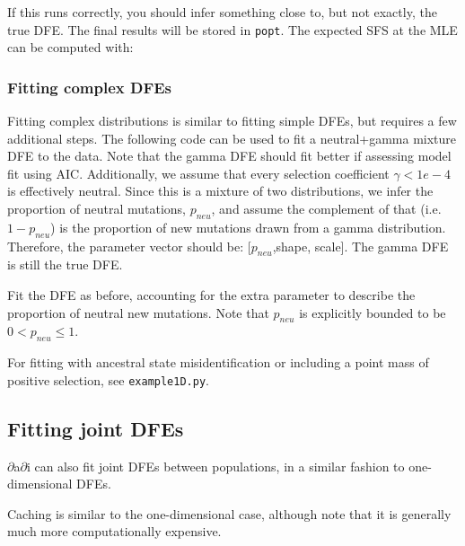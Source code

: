 \documentclass[12pt]{article}
\newcommand{\dadi}{$\partial$a$\partial$i\xspace}
\begin{document}
If this runs correctly, you should infer something close to, but not exactly, the true DFE. The final results will be stored in \texttt{popt}.
The expected SFS at the MLE can be computed with:



\subsubsection{Fitting complex DFEs}

Fitting complex distributions is similar to fitting simple DFEs, but requires a few additional steps. The following code can be used to fit a neutral+gamma mixture DFE to the data. Note that the gamma DFE should fit better if assessing model fit using AIC. Additionally, we assume that every selection coefficient $\gamma < 1e-4$ is effectively neutral. Since this is a mixture of two distributions, we infer the proportion of neutral mutations, $p_{neu}$, and assume the complement of that (i.e. $1-p_{neu}$) is the proportion of new mutations drawn from a gamma distribution. Therefore, the parameter vector should be: [$p_{neu}$,shape, scale]. The gamma DFE is still the true DFE.



Fit the DFE as before, accounting for the extra parameter to describe the proportion of neutral new mutations. Note that $p_{neu}$ is explicitly bounded to be $0 < p_{neu} \leq 1$.



For fitting with ancestral state misidentification or including a point mass of positive selection, see \texttt{example1D.py}.

\subsection{Fitting joint DFEs}

\dadi can also fit joint DFEs between populations, in a similar fashion to one-dimensional DFEs.

Caching is similar to the one-dimensional case, although note that it is generally much more computationally expensive.

\end{document}
